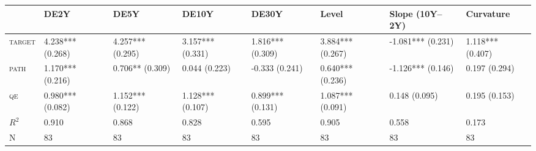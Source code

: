 \begin{tabular}{llllllll}
\toprule
 & DE2Y & DE5Y & DE10Y & DE30Y & Level & Slope (10Y--2Y) & Curvature \\
\midrule
\textsc{target} & 4.238*** (0.268) & 4.257*** (0.295) & 3.157*** (0.331) & 1.816*** (0.309) & 3.884*** (0.267) & -1.081*** (0.231) & 1.118*** (0.407) \\
\textsc{path} & 1.170*** (0.216) & 0.706** (0.309) & 0.044 (0.223) & -0.333 (0.241) & 0.640*** (0.236) & -1.126*** (0.146) & 0.197 (0.294) \\
\textsc{qe} & 0.980*** (0.082) & 1.152*** (0.122) & 1.128*** (0.107) & 0.899*** (0.131) & 1.087*** (0.091) & 0.148 (0.095) & 0.195 (0.153) \\
$R^2$ & 0.910 & 0.868 & 0.828 & 0.595 & 0.905 & 0.558 & 0.173 \\
N & 83 & 83 & 83 & 83 & 83 & 83 & 83 \\
\bottomrule
\end{tabular}
